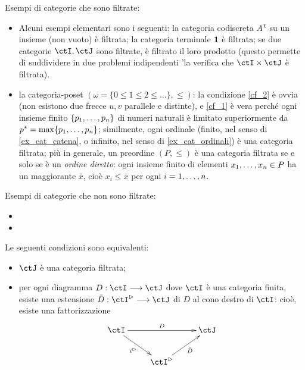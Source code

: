 \begin{examples}\label{contro_esempi_filt}
	Esempi di categorie che sono filtrate:
	\begin{itemize}
		\item Alcuni esempi elementari sono i seguenti: la categoria codiscreta \(A^\chi\) su un insieme (non vuoto) è filtrata; la categoria terminale \(\mathbf{1}\) è filtrata; se due categorie \(\ctI,\ctJ\) sono filtrate, è filtrato il loro prodotto (questo permette di suddividere in due problemi indipendenti 'la verifica che \(\ctI\times\ctJ\) è filtrata).
		\item la categoria-poset \((\omega=\{0\le 1\le 2\le\dots\},\le)\): la condizione \ref{cf_2} è ovvia (non esistono due frecce \(u,v\) parallele e distinte), e \ref{cf_1} è vera perché ogni insieme finito \(\{\tup pn,\}\) di numeri naturali è limitato superiormente da \(p^*=\max\{\tup pn,\}\); similmente, ogni ordinale (finito, nel senso di \ref{ex_cat_catena}, o infinito, nel senso di \ref{ex_cat_ordinali}) è una categoria filtrata; più in generale, un preordine \((P,\le)\) è una categoria filtrata se e solo se è un \emph{ordine diretto}: ogni insieme finito di elementi \(\tup xn, \in P\) ha un maggiorante \(\bar x\), cioè \(x_i\le \bar x\) per ogni \(i=\iter n\).
	\end{itemize}
	Esempi di categorie che non sono filtrate:
	\begin{itemize}
		\item\Todo{}
		\item\Todo{}
	\end{itemize}
\end{examples}
\begin{theorem}
	Le seguenti condizioni sono equivalenti:
	\begin{itemize}
		\item \(\ctJ\) è una categoria filtrata;
		\item per ogni diagramma \(D : \ctI \fun\ctJ\) dove \(\ctI\) è una categoria finita, esiste una estensione \(\bar D : \ctI^\rhd \fun \ctJ\) di \(D\) al cono destro di \(\ctI\): cioè, esiste una fattorizzazione
		      \[\xymatrix{
			      \ctI \ar[rr]^D \ar[dr]_-{i^\rhd} && \ctJ \\
			      & \ctI^\rhd\ar[ur]_-{\bar D}
			      }\]
	\end{itemize}
\end{theorem}

